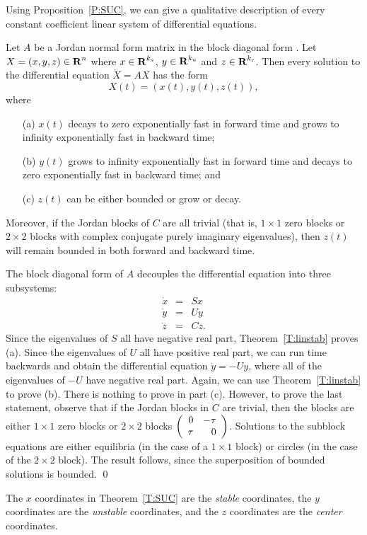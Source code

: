 Using Proposition~\ref{P:SUC}, we can give a qualitative description of 
every constant coefficient linear system of differential equations.
\begin{thm}  \label{T:SUC}
Let $A$ be a Jordan normal form matrix in the block diagonal form .
Let $X=(x,y,z)\in\mbox{$\bf{R}$}^n$ where $x\in\mbox{$\bf{R}$}^{k_s}$, $y\in\mbox{$\bf{R}$}^{k_u}$ and $z\in\mbox{$\bf{R}$}^{k_c}$.
Then every solution to the differential equation $\dot{X}=AX$ has the form
\[
X(t) = (x(t), y(t),z(t)),
\]
where
\begin{itemize}
\item[(a)]  $x(t)$ decays to zero exponentially fast in 
	forward time and grows to 
	infinity exponentially fast in backward time;
\item[(b)]  $y(t)$ grows to infinity exponentially fast in forward time and 
	decays to zero exponentially fast in backward time; and
\item[(c)]  $z(t)$ can be either bounded or grow or decay. 
\end{itemize}
Moreover, if the Jordan blocks of $C$ are all trivial
(that is, $1\times 1$ zero blocks or $2\times 2$ blocks with complex
conjugate purely imaginary eigenvalues), then $z(t)$ will remain bounded in 
both forward and backward time. 
\end{thm}

\proof  The block diagonal form of $A$ decouples the differential equation 
into three subsystems:
\begin{eqnarray*}
\dot{x} & = & Sx \\
\dot{y} & = & Uy \\
\dot{z} & = & Cz.
\end{eqnarray*}  
Since the eigenvalues of $S$ all have negative real part, Theorem~\ref{T:linstab} proves (a).  Since the eigenvalues of $U$ all have 
positive real part, we can run time backwards and obtain the differential 
equation $\dot{y}=-Uy$, where all of the eigenvalues of $-U$ have negative 
real part.  Again, we can use Theorem~\ref{T:linstab} to prove (b).  There 
is nothing to prove in part (c).  However, to prove the last statement, observe
that if the Jordan blocks in $C$ are trivial, then the blocks are either
$1\times 1$ zero blocks or $2\times 2$ blocks $\left(\begin{array}{rr} 0 & -\tau\\ \tau &0\end{array}\right)$.
Solutions to the subblock equations are either equilibria (in the case of a
$1\times 1$ block) or circles (in the case of the $2\times 2$ block).  The
result follows, since the superposition of bounded solutions is bounded. \qed

\begin{Def}
The $x$ coordinates in Theorem~\ref{T:SUC} are the {\em stable\/} coordinates,
the $y$ coordinates are the {\em unstable\/} coordinates, and the $z$ 
coordinates are the {\em center\/} coordinates.
\end{Def} 

